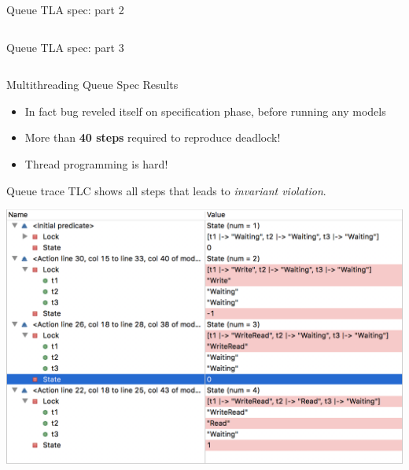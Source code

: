 \documentclass[12pt]{beamer}
\begin{document}
  \begin{frame}{Queue TLA spec: part 2}
      \begin{center}
          \inputminted[firstline=16,lastline=31,linenos,
            fontsize=\scriptsize]{tla}{figures/buffer.tla}
      \end{center}
  \end{frame}
  \begin{frame}{Queue TLA spec: part 3}
      \begin{center}
          \inputminted[firstline=32,lastline=50,linenos,
            fontsize=\scriptsize]{tla}{figures/buffer.tla}
      \end{center}
  \end{frame}
  \begin{frame}{Multithreading Queue Spec Results}
    \begin{itemize}
      \item In fact bug reveled itself on specification phase, before running any models
      \item More than \textbf{40 steps} required to reproduce deadlock!
      \item Thread programming is hard!
    \end{itemize}
  \end{frame}
  \begin{frame}{Queue trace}
      TLC shows all steps that leads to \textit{invariant violation}.
      \begin{center}
          \includegraphics[scale=0.45]{figures/tla_trace}
      \end{center}
  \end{frame}
\end{document}
